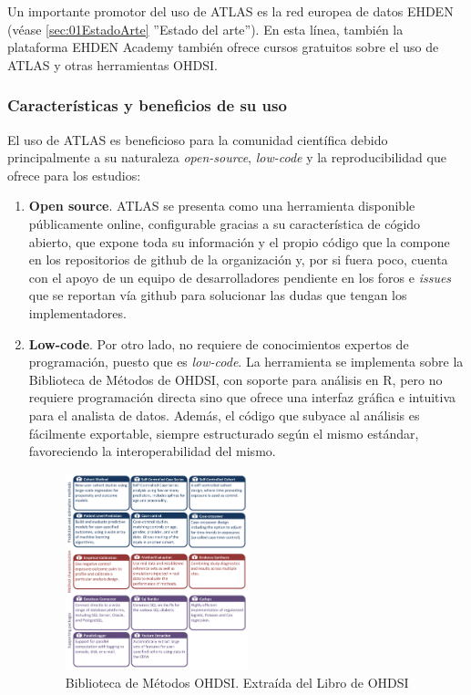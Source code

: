 Un importante promotor del uso de ATLAS es la red europea de datos EHDEN \cite{ehden} (véase \ref{sec:01EstadoArte} ''Estado del arte''). En esta línea, también la plataforma EHDEN Academy también ofrece cursos gratuitos sobre el uso de ATLAS y otras herramientas OHDSI.

\subsubsection{Características y beneficios de su uso}

El uso de ATLAS es beneficioso para la comunidad científica debido principalmente a su naturaleza \textit{open-source}, \textit{low-code} y la reproducibilidad que ofrece para los estudios:

\begin{enumerate}[label=\roman*.]

    \item \textbf{Open source}. ATLAS se presenta como una herramienta disponible públicamente online, configurable gracias a su característica de cógido abierto, que expone toda su información y el propio código que la compone en los repositorios de github de la organización y, por si fuera poco, cuenta con el apoyo de un equipo de desarrolladores pendiente en los foros e \textit{issues} que se reportan vía github para solucionar las dudas que tengan los implementadores. 

    \item \textbf{Low-code}. Por otro lado, no requiere de conocimientos expertos de programación, puesto que es \textit{low-code}. La herramienta se implementa sobre la Biblioteca de Métodos de OHDSI, con soporte para análisis en R, pero no requiere programación directa sino que ofrece una interfaz gráfica e intuitiva para el analista de datos. Además, el código que subyace al análisis es fácilmente exportable, siempre estructurado según el mismo estándar, favoreciendo la interoperabilidad del mismo.

\begin{figure}[H]
\centering
\includegraphics[width=0.50\textwidth]{figures/methodsLibrary.png}
\caption{Biblioteca de Métodos OHDSI. Extraída del Libro de OHDSI \cite{OHDSIbook}}
\label{fig:methodsLibrary}
\end{figure}
    

\end{enumerate}
